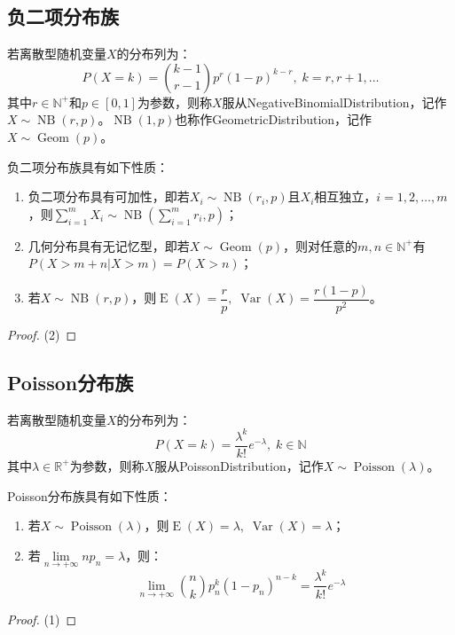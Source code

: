 \subsection{负二项分布族}
\begin{definition}
	若离散型随机变量$X$的分布列为：
	\begin{equation*}
		P(X=k)=\binom{k-1}{r-1}p^r(1-p)^{k-r},\;k=r,r+1,\dots
	\end{equation*}
	其中$r\in\mathbb{N}^+$和$p\in[0,1]$为参数，则称$X$服从\gls{NegativeBinomialDistribution}，记作$X\sim\operatorname{NB}(r,p)$。$\operatorname{NB}(1,p)$也称作\gls{GeometricDistribution}，记作$X\sim\operatorname{Geom}(p)$。
\end{definition}
\begin{property}
	负二项分布族具有如下性质：
	\begin{enumerate}
		\item 负二项分布具有可加性，即若$X_i\sim\operatorname{NB}(r_i,p)$且$X_i$相互独立，$i=1,2,\dots,m$，则$\sum\limits_{i=1}^{m}X_i\sim\operatorname{NB}\left(\sum\limits_{i=1}^{m}r_i,p\right)$；
		\item 几何分布具有无记忆型，即若$X\sim\operatorname{Geom}(p)$，则对任意的$m,n\in\mathbb{N}^+$有$P(X>m+n|X>m)=P(X>n)$；
		\item 若$X\sim\operatorname{NB}(r,p)$，则$\operatorname{E}(X)=\dfrac{r}{p},\;\operatorname{Var}(X)=\dfrac{r(1-p)}{p^2}$。
	\end{enumerate}
\end{property}
\begin{proof}
	(2)
\end{proof}

\subsection{Poisson分布族}
\begin{definition}
	若离散型随机变量$X$的分布列为：
	\begin{equation*}
		P(X=k)=\frac{\lambda^k}{k!}e^{-\lambda},\;k\in\mathbb{N}
	\end{equation*}
	其中$\lambda\in\mathbb{R}^{+}$为参数，则称$X$服从\gls{PoissonDistribution}，记作$X\sim\operatorname{Poisson}(\lambda)$。
\end{definition}
\begin{property}
	Poisson分布族具有如下性质：
	\begin{enumerate}
		\item 若$X\sim\operatorname{Poisson}(\lambda)$，则$\operatorname{E}(X)=\lambda,\;\operatorname{Var}(X)=\lambda$；
		\item 若$\lim\limits_{n\to+\infty}np_n=\lambda$，则：
		\begin{equation*}
			\lim_{n\to+\infty}\binom{n}{k}p_n^k(1-p_n)^{n-k}=\frac{\lambda^k}{k!}e^{-\lambda}
		\end{equation*}
	\end{enumerate}
\end{property}
\begin{proof}
	(1)
\end{proof}



